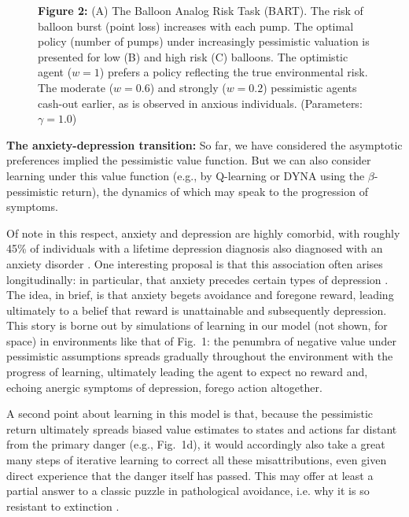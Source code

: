 \documentclass[11pt]{article} %
\begin{document}
\begin{figure}
  \centerline{%
  }
  \par \textbf{Figure 2:} (A) The Balloon Analog Risk Task (BART). The risk of balloon burst (point loss) increases with each pump. The optimal policy (number of pumps) under increasingly pessimistic valuation is presented for low (B) and high risk (C) balloons. The optimistic agent ($w=1$) prefers a policy reflecting the true environmental risk. The moderate ($w=0.6$) and strongly ($w=0.2$) pessimistic agents cash-out earlier, as is observed in anxious individuals. (Parameters: $\gamma = 1.0$)
\end{figure}

\textbf{The anxiety-depression transition:} So far, we have considered the asymptotic preferences implied the pessimistic value function. But we can also consider learning under this value function (e.g., by Q-learning or DYNA using the $\beta$-pessimistic return), the dynamics of which may speak to the progression of symptoms.

Of note in this respect, anxiety and depression are highly comorbid, with roughly 45\% of individuals with a lifetime depression diagnosis also diagnosed with an anxiety disorder \citep{kessler2015}. One interesting proposal is that this association often arises longitudinally: in particular, that anxiety precedes certain types of depression \citep{alloy1990, jacobson2014}. The idea, in brief, is that anxiety begets avoidance and foregone reward, leading ultimately to a belief that reward is unattainable and subsequently depression. This story is borne out by simulations of learning in our model (not shown, for space) in environments like that of Fig.~1: the penumbra of negative value under pessimistic assumptions spreads gradually throughout the environment with the progress of learning, ultimately leading the agent to expect no reward and, echoing anergic symptoms of depression, forego action altogether.

A second point about learning in this model is that, because the pessimistic return ultimately spreads biased value estimates to states and actions far distant from the primary danger (e.g., Fig.~1d), it would accordingly also take a great many steps of iterative learning to correct all these misattributions, even given direct experience that the danger itself has passed. This may offer at least a partial answer to a classic puzzle in pathological avoidance, i.e. why it is so resistant to extinction \cite{moutoussis2018}.
\end{document}
